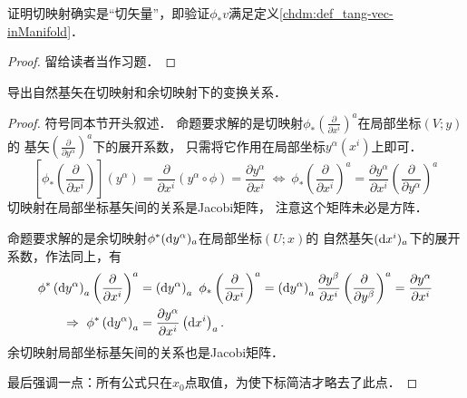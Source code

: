 \begin{proposition}
    证明切映射确实是“切矢量”，即验证$\phi_{*}v$满足定义\ref{chdm:def_tang-vec-inManifold}．
\end{proposition}
\begin{proof}
    留给读者当作习题．
\end{proof}

\begin{proposition}\label{chdm:thm_coortrans}
    导出自然基矢在切映射和余切映射下的变换关系．
\end{proposition}
\begin{proof}
符号同本节开头叙述．
命题要求解的是切映射$\phi_{*}(\frac{\partial}{\partial x^i})^a$在局部坐标$(V;y)$的
基矢$(\frac{\partial}{\partial y^\alpha})^a$下的展开系数，
只需将它作用在局部坐标$y^\alpha(x^i)$上即可．
\begin{equation}\label{chdm:eqn_push-bases}
    \left[\phi_{*}\left(\frac{\partial}{\partial x^i}\right)\right] (y^\alpha) 
    =\frac{\partial}{\partial x^i} \left(y^\alpha \circ \phi \right) 
    =\frac{\partial y^\alpha}{\partial x^i} 
    \ \Leftrightarrow\ \phi_{*}
    \left(\frac{\partial}{\partial x^i}\right)^a = \frac{\partial y^\alpha}{\partial x^i}
    \left(\frac{\partial}{\partial y^\alpha}\right)^a 
\end{equation}  %
切映射在局部坐标基矢间的关系是Jacobi矩阵，
注意这个矩阵未必是方阵．

命题要求解的是余切映射${\phi ^*}( {\rm{d}}{y^\alpha } )_a$在局部坐标$(U;x)$的
自然基矢$({\rm{d}}{x^i })_a$下的展开系数，作法同上，有
\begin{align}
    {\phi ^*}\left( {{\rm{d}}{y^\alpha }} \right)_a 
    \left(\frac{\partial}{\partial x^i}\right) ^a 
    &= \left( {{\rm{d}}{y^\alpha }} \right)_a \ {\phi _*}
    \left(\frac{\partial}{\partial x^i}\right) ^a 
    = \left( {{\rm{d}}{y^\alpha }} \right)_a 
    \frac{\partial y^\beta}{\partial x^i}
    \left(\frac{\partial}{\partial y^\beta}\right)^a
    = \frac{{\partial {y^\alpha }}}{{\partial {x^i}}} \notag \\
    \Rightarrow \ 
    {\phi ^*}\left( {{\rm{d}}{y^\alpha }} \right)_a &=
     \frac{{\partial {y^\alpha }}}{{\partial {x^i}}} 
     \left( {{\rm{d}}{x^i }} \right)_a  . \label{chdm:eqn_pull-bases}
\end{align}
余切映射局部坐标基矢间的关系也是Jacobi矩阵．

最后强调一点：所有公式只在$x_0$点取值，为使下标简洁才略去了此点．
\end{proof}

